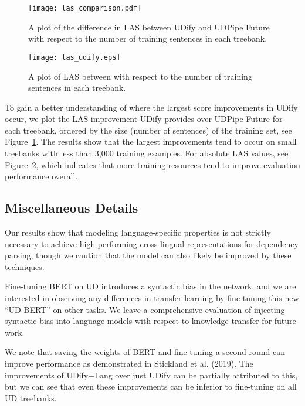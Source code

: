 \documentclass[11pt,a4paper]{article}
\begin{document}
\begin{figure}[tbp]
    \centering
    \texttt{[image: las\_comparison.pdf]}
    \caption{\label{fig:las-comparison}
        A plot of the difference in LAS between UDify and UDPipe Future with respect to the number of training sentences in each treebank.
    }
\end{figure}

\begin{figure}[tbp]
    \centering
    \texttt{[image: las\_udify.eps]}
    \caption{\label{fig:udify-las}
        A plot of LAS between with respect to the number of training sentences in each treebank.
    }
\end{figure}

To gain a better understanding of where the largest score improvements in UDify occur, we plot the LAS improvement UDify provides over UDPipe Future for each treebank, ordered by the size (number of sentences) of the training set, see Figure~\ref{fig:las-comparison}. The results show that the largest improvements tend to occur on small treebanks with less than 3,000 training examples. For absolute LAS values, see Figure~\ref{fig:udify-las}, which indicates that more training resources tend to improve evaluation performance overall.



\subsection{Miscellaneous Details} \label{sec:misc-details}

Our results show that modeling language-specific properties is not strictly necessary to achieve high-performing cross-lingual representations for dependency parsing, though we caution that the model can also likely be improved by these techniques.

Fine-tuning BERT on UD introduces a syntactic bias in the network, and we are interested in observing any differences in transfer learning by fine-tuning this new ``UD-BERT'' on other tasks. We leave a comprehensive evaluation of injecting syntactic bias into language models with respect to knowledge transfer for future work.

We note that saving the weights of BERT and fine-tuning a second round can improve performance as demonstrated in Stickland et al. (2019).
The improvements of UDify+Lang over just UDify can be partially attributed to this, but we can see that even these improvements can be inferior to fine-tuning on all UD treebanks.
\end{document}
